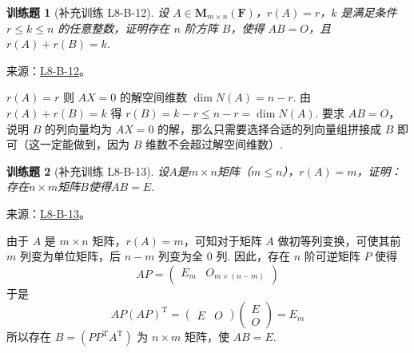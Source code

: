 \documentclass[12pt,fontset=fandol]{ctexart}
\newtheorem{exercise}{训练题}[section]
\begin{document}
\begin{exercise}[补充训练 L8-B-12]\label{prob:L8-B-12}
设 $A \in \mathbf{M}_{m \times n}(\mathbf{F})$，$r(A)=r$，$k$ 是满足条件 $r \leqslant k \leqslant n$ 的任意整数，证明存在 $n$ 阶方阵 $B$，使得 $AB=O$，且 $r(A)+r(B)=k$.
\end{exercise}
\noindent 来源：\href{https://github.com/yhwu-is/Linear-Algebra-Left-Undone/blob/new/%E8%AE%B2%E4%B9%89/%E4%B8%93%E9%A2%98/8%20%E7%9B%B8%E6%8A%B5%E6%A0%87%E5%87%86%E5%BD%A2.tex}{L8-B-12}。
\begin{solve}
$r(A)=r$ 则 $AX=0$ 的解空间维数 $\dim N(A) = n-r$. 由 $r(A)+r(B)=k$ 得 $r(B)=k-r \leqslant n-r=\dim N(A)$. 要求 $AB=O$，说明 $B$ 的列向量均为 $AX=0$ 的解，那么只需要选择合适的列向量组拼接成 $B$ 即可（这一定能做到，因为 $B$ 维数不会超过解空间维数）.
\end{solve}

\begin{exercise}[补充训练 L8-B-13]\label{prob:L8-B-13}
设$A$是$m \times n$矩阵（$m \leqslant n$），$r(A)=m$，证明：存在$n \times m$矩阵$B$使得$AB=E$.
\end{exercise}
\noindent 来源：\href{https://github.com/yhwu-is/Linear-Algebra-Left-Undone/blob/new/%E8%AE%B2%E4%B9%89/%E4%B8%93%E9%A2%98/8%20%E7%9B%B8%E6%8A%B5%E6%A0%87%E5%87%86%E5%BD%A2.tex}{L8-B-13}。
\begin{solve}
由于 $A$ 是 $m\times n$ 矩阵，$r(A)=m$，可知对于矩阵 $A$ 做初等列变换，可使其前 $m$ 列变为单位矩阵，后 $n-m$ 列变为全 0 列. 因此，存在 $n$ 阶可逆矩阵 $P$ 使得
          \[AP=\begin{pmatrix}E_m & O_{m\times (n-m)}\end{pmatrix}\]
          于是\[AP(AP)^{\mathrm{T}} = \begin{pmatrix}E & O\end{pmatrix} \begin{pmatrix}E \\ O\end{pmatrix}=E_m\]
          所以存在 $B=(PP^{\mathrm{T}}A^{\mathrm{T}})$ 为 $n\times m$ 矩阵，使 $AB=E$.
\end{solve}
\end{document}
